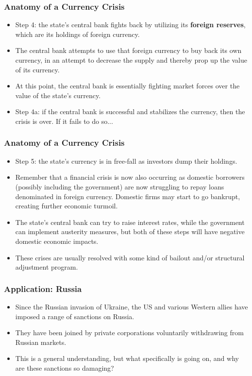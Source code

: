 \documentclass{beamer}
\begin{document}
\begin{frame} 
	\frametitle{\LARGE{Anatomy of a Currency Crisis}}
	\begin{itemize}
		\item Step 4: the state's central bank fights back by utilizing its \textbf{foreign reserves}, which are its holdings of foreign currency. \pause
		\item The central bank attempts to use that foreign currency to buy back its own currency, in an attempt to decrease the supply and thereby prop up the value of its currency. \pause
		\item At this point, the central bank is essentially fighting market forces over the value of the state's currency. \pause
		\item Step 4a: if the central bank is successful and stabilizes the currency, then the crisis is over. If it fails to do so...
	\end{itemize}
\end{frame}

\begin{frame} 
	\frametitle{\LARGE{Anatomy of a Currency Crisis}}
	\begin{itemize}
		\item Step 5: the state's currency is in free-fall as investors dump their holdings.
		\item Remember that a financial crisis is now also occurring as domestic borrowers (possibly including the government) are now struggling to repay loans denominated in foreign currency. Domestic firms may start to go bankrupt, creating further economic turmoil.  \pause
		\item The state's central bank can try to raise interest rates, while the government can implement austerity measures, but both of these steps will have negative domestic economic impacts.
		\item These crises are usually resolved with some kind of bailout and/or structural adjustment program.
	\end{itemize}
\end{frame}

\begin{frame} 
	\frametitle{\LARGE{Application: Russia}}
	\begin{itemize}
		\item Since the Russian invasion of Ukraine, the US and various Western allies have imposed a range of sanctions on Russia. \pause
		\item They have been joined by private corporations voluntarily withdrawing from Russian markets. \pause
		\item This is a general understanding, but what specifically is going on, and why are these sanctions so damaging?
	\end{itemize}
\end{frame}
\end{document}
